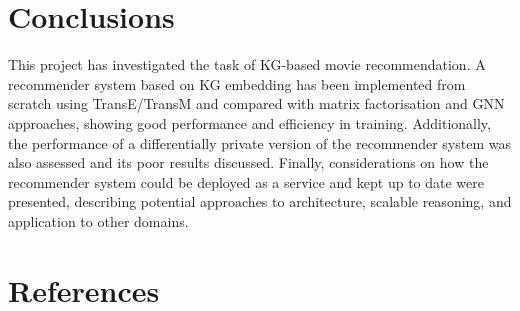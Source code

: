 \section{Conclusions}\label{sec:conclusions}

This project has investigated the task of KG-based movie recommendation.
A recommender system based on KG embedding has been implemented from scratch using TransE/TransM and compared with matrix factorisation and GNN approaches, showing good performance and efficiency in training.
Additionally, the performance of a differentially private version of the recommender system was also assessed and its poor results discussed.
Finally, considerations on how the recommender system could be deployed as a service and kept up to date were presented, describing potential approaches to architecture, scalable reasoning, and application to other domains.


\section{References}
\printbibliography


